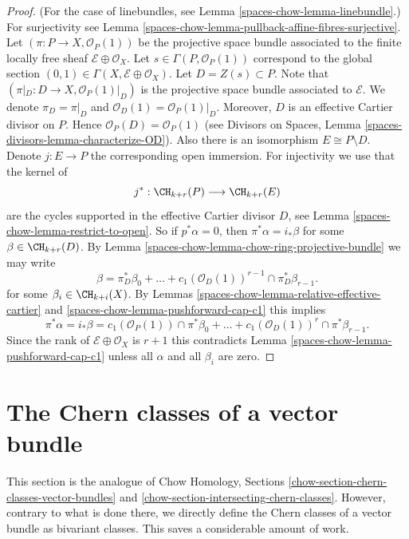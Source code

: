 \begin{proof}
(For the case of linebundles, see Lemma \ref{spaces-chow-lemma-linebundle}.)
For surjectivity see Lemma \ref{spaces-chow-lemma-pullback-affine-fibres-surjective}.
Let $(\pi  : P \to X, \mathcal{O}_P(1))$
be the projective space bundle associated
to the finite locally free sheaf $\mathcal{E} \oplus \mathcal{O}_X$.
Let $s \in \Gamma(P, \mathcal{O}_P(1))$ correspond to the global
section $(0, 1) \in \Gamma(X, \mathcal{E} \oplus \mathcal{O}_X)$.
Let $D = Z(s) \subset P$. Note that
$(\pi|_D : D \to X , \mathcal{O}_P(1)|_D)$
is the projective space bundle associated
to $\mathcal{E}$. We denote $\pi_D = \pi|_D$ and
$\mathcal{O}_D(1) = \mathcal{O}_P(1)|_D$.
Moreover, $D$ is an effective
Cartier divisor on $P$. Hence $\mathcal{O}_P(D) = \mathcal{O}_P(1)$
(see Divisors on Spaces, Lemma \ref{spaces-divisors-lemma-characterize-OD}).
Also there is an isomorphism
$E \cong P \setminus D$. Denote $j : E \to P$ the
corresponding open immersion.
For injectivity we use that the kernel of
$$
j^* :
\CH_{k + r}(P)
\longrightarrow
\CH_{k + r}(E)
$$
are the cycles supported in the effective Cartier divisor $D$,
see Lemma \ref{spaces-chow-lemma-restrict-to-open}. So if $p^*\alpha = 0$, then
$\pi^*\alpha = i_*\beta$ for some $\beta \in \CH_{k + r}(D)$.
By Lemma \ref{spaces-chow-lemma-chow-ring-projective-bundle} we may write
$$
\beta = \pi_D^*\beta_0 +
\ldots + c_1(\mathcal{O}_D(1))^{r - 1} \cap \pi_D^* \beta_{r - 1}.
$$
for some $\beta_i \in \CH_{k + i}(X)$.
By Lemmas \ref{spaces-chow-lemma-relative-effective-cartier}
and \ref{spaces-chow-lemma-pushforward-cap-c1}
this implies
$$
\pi^*\alpha = i_*\beta =
c_1(\mathcal{O}_P(1)) \cap \pi^*\beta_0 +
\ldots +
c_1(\mathcal{O}_D(1))^r \cap \pi^*\beta_{r - 1}.
$$
Since the rank of $\mathcal{E} \oplus \mathcal{O}_X$ is $r + 1$
this contradicts Lemma \ref{spaces-chow-lemma-pushforward-cap-c1} unless all
$\alpha$ and all $\beta_i$ are zero.
\end{proof}

\section{The Chern classes of a vector bundle}
\label{spaces-chow-section-chern-classes-vector-bundles}
This section is the analogue of Chow Homology, Sections
\ref{chow-section-chern-classes-vector-bundles} and
\ref{chow-section-intersecting-chern-classes}.
However, contrary to what is done there, we directly
define the Chern classes of a vector bundle as bivariant classes.
This saves a considerable amount of work.

